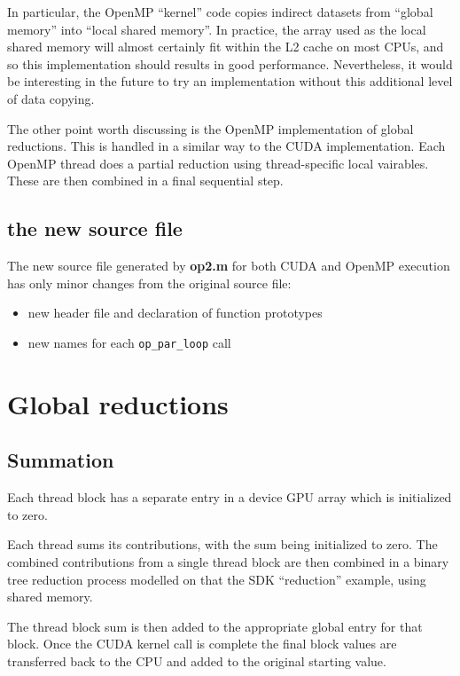 \documentclass[12pt]{article}
\begin{document}
In particular, the OpenMP ``kernel'' code copies indirect datasets
from ``global memory'' into ``local shared memory''.  In practice,
the array used as the local shared memory will almost certainly fit
within the L2 cache on most CPUs, and so this implementation should
results in good performance.  Nevertheless, it would be interesting
in the future to try an implementation without this additional level
of data copying.

The other point worth discussing is the OpenMP implementation of
global reductions.  This is handled in a similar way to the CUDA 
implementation.  Each OpenMP thread does a partial reduction using
thread-specific local vairables.  These are then combined in a final
sequential step.

\subsection{the new source file}

The new source file generated by {\bf op2.m} for both CUDA and OpenMP
execution has only minor changes from the original source file:
\begin{itemize}
\item
new header file and declaration of function prototypes

\item
new names for each {\tt op\_par\_loop} call
\end{itemize}

\newpage

\section{Global reductions}

\subsection{Summation}

Each thread block has a separate entry in a device GPU array which is 
initialized to zero.

Each thread sums its contributions, with the sum being initialized to zero.
The combined contributions from a single thread block are then combined 
in a binary tree reduction process modelled on that the SDK ``reduction'' 
example, using shared memory.  

The thread block sum is then added to the appropriate global entry for that 
block.  Once the CUDA kernel call is complete the final block values are 
transferred back to the CPU and added to the original starting value.
\end{document}
